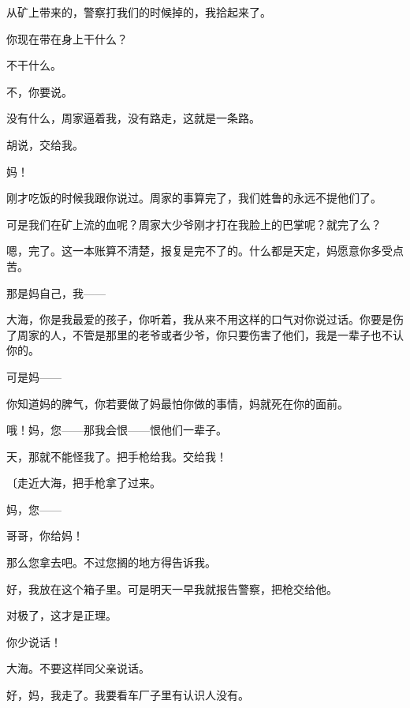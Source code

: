 从矿上带来的，警察打我们的时候掉的，我拾起来了。

你现在带在身上干什么？

不干什么。

不，你要说。

没有什么，周家逼着我，没有路走，这就是一条路。

胡说，交给我。

妈！

刚才吃饭的时候我跟你说过。周家的事算完了，我们姓鲁的永远不提他们了。

可是我们在矿上流的血呢？周家大少爷刚才打在我脸上的巴掌呢？就完了么？

嗯，完了。这一本账算不清楚，报复是完不了的。什么都是天定，妈愿意你多受点苦。

那是妈自己，我——

大海，你是我最爱的孩子，你听着，我从来不用这样的口气对你说过话。你要是伤了周家的人，不管是那里的老爷或者少爷，你只要伤害了他们，我是一辈子也不认你的。

可是妈——

你知道妈的脾气，你若要做了妈最怕你做的事情，妈就死在你的面前。

哦！妈，您——那我会恨——恨他们一辈子。

天，那就不能怪我了。把手枪给我。交给我！

{\fangsong〔走近大海，把手枪拿了过来。}

妈，您——

哥哥，你给妈！

那么您拿去吧。不过您搁的地方得告诉我。

好，我放在这个箱子里。可是明天一早我就报告警察，把枪交给他。

对极了，这才是正理。

你少说话！

大海。不要这样同父亲说话。

好，妈，我走了。我要看车厂子里有认识人没有。

